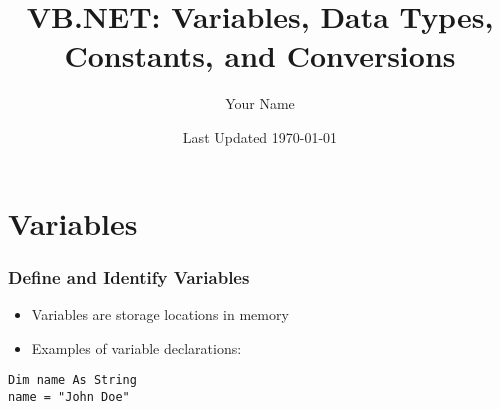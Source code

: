 \documentclass{beamer}
\title{VB.NET: Variables, Data Types, Constants, and Conversions}
\author{Your Name}
\date{Last Updated \today}
\begin{document}
\frame{\titlepage}

\section{Variables}
\begin{frame}
  \frametitle{Define and Identify Variables}
  \begin{itemize}
    \item Variables are storage locations in memory
    \item Examples of variable declarations:
  \end{itemize}
  \texttt{Dim name As String} \\
  \texttt{name = "John Doe"}
\end{frame}
\end{document}
